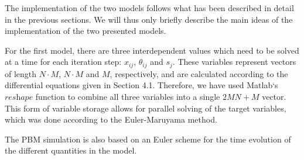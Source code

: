 The implementation of the two models follows what has been described in detail in the previous sections. We will thus only briefly describe the main ideas of the implementation of the two presented models.

For the first model, there are three interdependent values which need to be solved at a time for each iteration step: $x_{ij}$, $\theta_{ij}$ and $s_{j}$. These variables represent vectors of length $N \cdot M$, $N \cdot M$ and $M$, respectively, and are calculated according to the differential equations given in Section 4.1. Therefore, we have  used Matlab‘s $\textit{reshape}$ function to combine all three variables into a single $2MN+M$ vector. This form of variable storage allows for parallel solving of the target variables, which was done according to the Euler-Maruyama method.

The PBM simulation is also based on an Euler scheme for the time evolution of the different quantities in the model. 
